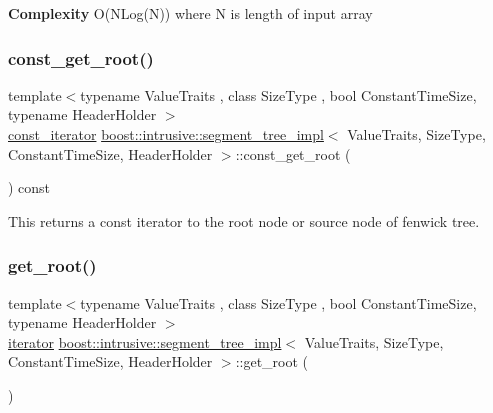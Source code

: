 {\bfseries  Complexity } O(\+N\+Log(\+N)) where N is length of input array \mbox{\label{classboost_1_1intrusive_1_1segment__tree__impl_a562cca39fe52f31330ff71f32d58fb72}} 
\subsubsection{\texorpdfstring{const\+\_\+get\+\_\+root()}{const\_get\_root()}}
{\footnotesize\ttfamily template$<$typename Value\+Traits , class Size\+Type , bool Constant\+Time\+Size, typename Header\+Holder $>$ \\
\hyperlink{classboost_1_1intrusive_1_1segment__tree__impl_a6957e501101f1d5427f611f6ee8d1ded}{const\+\_\+iterator} \hyperlink{classboost_1_1intrusive_1_1segment__tree__impl}{boost\+::intrusive\+::segment\+\_\+tree\+\_\+impl}$<$ Value\+Traits, Size\+Type, Constant\+Time\+Size, Header\+Holder $>$\+::const\+\_\+get\+\_\+root (\begin{DoxyParamCaption}{ }\end{DoxyParamCaption}) const\hspace{0.3cm}{\ttfamily [inline]}}

This returns a const iterator to the root node or source node of fenwick tree. \mbox{\label{classboost_1_1intrusive_1_1segment__tree__impl_a684131001e17323dfbf6b1781c632471}} 
\subsubsection{\texorpdfstring{get\+\_\+root()}{get\_root()}}
{\footnotesize\ttfamily template$<$typename Value\+Traits , class Size\+Type , bool Constant\+Time\+Size, typename Header\+Holder $>$ \\
\hyperlink{classboost_1_1intrusive_1_1segment__tree__impl_a9f1be9b01be5078fb59b2e34520b374a}{iterator} \hyperlink{classboost_1_1intrusive_1_1segment__tree__impl}{boost\+::intrusive\+::segment\+\_\+tree\+\_\+impl}$<$ Value\+Traits, Size\+Type, Constant\+Time\+Size, Header\+Holder $>$\+::get\+\_\+root (\begin{DoxyParamCaption}{ }\end{DoxyParamCaption})\hspace{0.3cm}{\ttfamily [inline]}}

